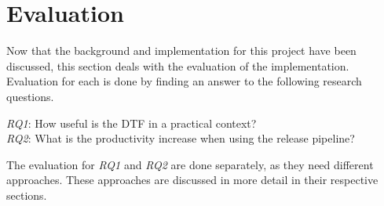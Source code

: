 \chapter{Evaluation}\label{ch:evaluation}

Now that the background and implementation for this project have been discussed, this section deals with the evaluation of the implementation.
Evaluation for each is done by finding an answer to the following research questions.

\textit{RQ1}: How useful is the DTF in a practical context? \\
\textit{RQ2}: What is the productivity increase when using the release pipeline?

The evaluation for \textit{RQ1} and \textit{RQ2} are done separately, as they need different approaches.
These approaches are discussed in more detail in their respective sections.



